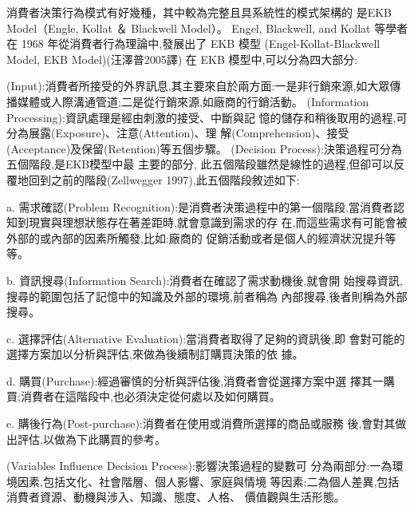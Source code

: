 消費者決策行為模式有好幾種，其中較為完整且具系統性的模式架構的
是EKB Model（Engle, Kollat ＆ Blackwell Model）。
Engel, Blackwell, and Kollat 等學者在 1968 年從消費者行為理論中,發展出了 EKB 模型 (Engel-Kollat-Blackwell Model, EKB Model)(汪澤普2005譯)\cite{汪澤普}
在 EKB 模型中,可以分為四大部分:
\begin{enumerate}
(Input):消費者所接受的外界訊息,其主要來自於兩方面:一是非行銷來源,如大眾傳播媒體或人際溝通管道;二是從行銷來源,如廠商的行銷活動。
(Information Processing):資訊處理是經由刺激的接受、中斷與記
憶的儲存和稍後取用的過程,可分為展露(Exposure)、注意(Attention)、理
解(Comprehension)、接受(Acceptance)及保留(Retention)等五個步驟。
(Decision Process):決策過程可分為五個階段,是EKB模型中最 主要的部分,
此五個階段雖然是線性的過程,但卻可以反覆地回到之前的階段(Zellwegger 1997),此五個階段敘述如下:

a. 需求確認(Problem Recognition):是消費者決策過程中的第一個階段,當消費者認知到現實與理想狀態存在著差距時,就會意識到需求的存 在,而這些需求有可能會被外部的或內部的因素所觸發,比如:廠商的 促銷活動或者是個人的經濟狀況提升等等。

b. 資訊搜尋(Information Search):消費者在確認了需求動機後,就會開 始搜尋資訊,搜尋的範圍包括了記憶中的知識及外部的環境,前者稱為 內部搜尋,後者則稱為外部搜尋。

c. 選擇評估(Alternative Evaluation):當消費者取得了足夠的資訊後,即 會對可能的選擇方案加以分析與評估,來做為後續制訂購買決策的依 據。

d. 購買(Purchase):經過審慎的分析與評估後,消費者會從選擇方案中選 擇其一購買;消費者在這階段中,也必須決定從何處以及如何購買。

e. 購後行為(Post-purchase):消費者在使用或消費所選擇的商品或服務 後,會對其做出評估,以做為下此購買的參考。

(Variables Influence Decision Process):影響決策過程的變數可 分為兩部分:一為環境因素,包括文化、社會階層、個人影響、家庭與情境 等因素;二為個人差異,包括消費者資源、動機與涉入、知識、態度、人格、 價值觀與生活形態。
\end{enumerate}



